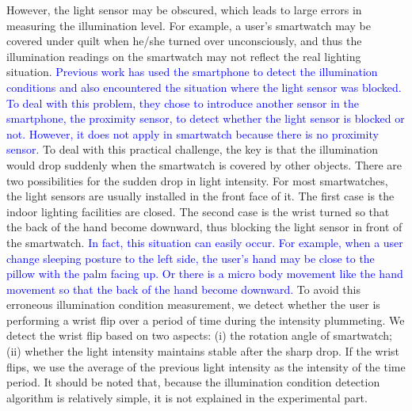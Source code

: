 However, the light sensor may be obscured, which leads to large errors in measuring the illumination level. For example, a user's smartwatch may be covered under quilt when he/she turned over unconsciously, and thus the illumination readings on the smartwatch may not reflect the real lighting situation. \textcolor{blue}{Previous work has used the smartphone to detect the illumination conditions and also encountered the situation where the light sensor was blocked. To deal with this problem, they chose to introduce another sensor in the smartphone, the proximity sensor,  to detect whether the light sensor is blocked or not. However, it does not apply in smartwatch because there is no proximity sensor.} To deal with this practical challenge, the key is that the illumination would drop suddenly when the smartwatch is covered by other objects. There are two possibilities for the sudden drop in light intensity. For most smartwatches, the light sensors are usually installed in the front face of it. The first case is the indoor lighting facilities are closed. The second case is the wrist turned so that the back of the hand become downward, thus blocking the light sensor in front of the smartwatch. \textcolor{blue}{In fact, this situation can easily occur. For example, when a user change sleeping posture to the left side, the user's hand may be close to the pillow with the palm facing up. Or there is a micro body movement like the hand movement so that the back of the hand become downward.} To avoid this erroneous illumination condition measurement, we detect whether the user is performing a wrist flip over a period of time during the intensity plummeting. We detect the wrist flip based on two aspects: (i) the rotation angle of smartwatch; (ii) whether the light intensity maintains stable after the sharp drop. If the wrist flips, we use the average of the previous light intensity as the intensity of the time period. It should be noted that, because the illumination condition detection algorithm is relatively simple, it is not explained in the experimental part.

